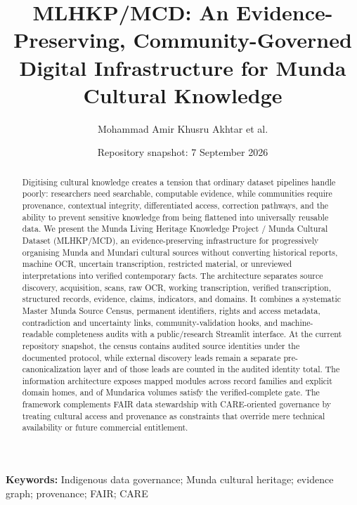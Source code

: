 \documentclass[11pt]{article}
\title{MLHKP/MCD: An Evidence-Preserving, Community-Governed Digital Infrastructure for Munda Cultural Knowledge}
\author{Mohammad Amir Khusru Akhtar et al.}
\date{Repository snapshot: 7 September 2026}
\begin{document}
\maketitle

\begin{abstract}
Digitising cultural knowledge creates a tension that ordinary dataset pipelines handle poorly: researchers need searchable, computable evidence, while communities require provenance, contextual integrity, differentiated access, correction pathways, and the ability to prevent sensitive knowledge from being flattened into universally reusable data. We present the Munda Living Heritage Knowledge Project / Munda Cultural Dataset (MLHKP/MCD), an evidence-preserving infrastructure for progressively organising Munda and Mundari cultural sources without converting historical reports, machine OCR, uncertain transcription, restricted material, or unreviewed interpretations into verified contemporary facts. The architecture separates source discovery, acquisition, scans, raw OCR, working transcription, verified transcription, structured records, evidence, claims, indicators, and domains. It combines a systematic Master Munda Source Census, permanent identifiers, rights and access metadata, contradiction and uncertainty links, community-validation hooks, and machine-readable completeness audits with a public/research Streamlit interface. At the current repository snapshot, the census contains \MLHKPSourcesDiscovered{} audited source identities under the documented protocol, while \MLHKPWebDiscoveryLeads{} external discovery leads remain a separate pre-canonicalization layer and \MLHKPWebDiscoveryCounted{} of those leads are counted in the audited identity total. The information architecture exposes \MLHKPModules{} mapped modules across \MLHKPRecordFamilies{} record families and \MLHKPDomainHomes{} explicit domain homes, and \MLHKPMundaricaVerified{} of \MLHKPMundaricaExpected{} Mundarica volumes satisfy the verified-complete gate. The framework complements FAIR data stewardship with CARE-oriented governance by treating cultural access and provenance as constraints that override mere technical availability or future commercial entitlement.
\end{abstract}

\noindent\textbf{Keywords:} Indigenous data governance; Munda cultural heritage; evidence graph; provenance; FAIR; CARE
\end{document}
